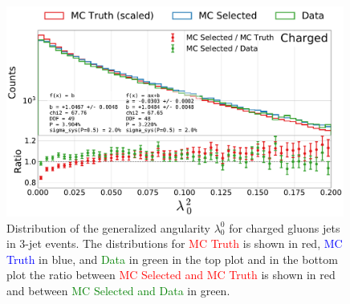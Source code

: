 \begin{figure}[h!]
  \centerfloat
  \includegraphics[width=0.99\textwidth, trim=0 0 0 0, clip, page=5]{figures/quarks/generalized_angularities_cha-down_sample=1.00-ML_vars=vertex-selection=b-ejet_min=4-n_iter_RS_lgb=99-n_iter_RS_xgb=9-cdot_cut=0.90-version=19.pdf}
  \caption[Generalized Angularities for Charged Gluons Jets: $\lambda_0^0$]
          {Distribution of the generalized angularity $\lambda_0^0$ for charged gluons jets in 3-jet events. The distributions for \textcolor{red}{MC Truth} is shown in red, \textcolor{blue}{MC Truth} in blue, and \textcolor{green}{Data} in green in the top plot and in the bottom plot the ratio between \textcolor{red}{MC Selected and MC Truth} is shown in red and between \textcolor{green}{MC Selected and Data} in green. }
  \label{fig:q:generalized_angularities_cha_lambda_0_0}
\end{figure}



